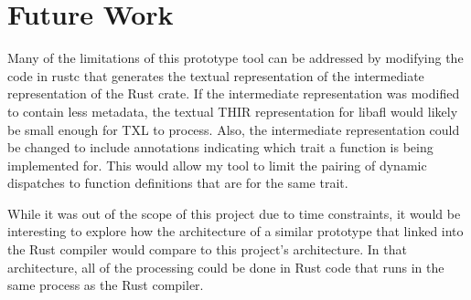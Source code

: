 \documentclass[11pt]{article}
\begin{document}
\section{Future Work}

Many of the limitations of this prototype tool can be addressed by modifying the code in rustc that generates the textual representation of the intermediate representation of the Rust crate.
If the intermediate representation was modified to contain less metadata, the textual THIR representation for libafl would likely be small enough for TXL to process.
Also, the intermediate representation could be changed to include annotations indicating which trait a function is being implemented for.
This would allow my tool to limit the pairing of dynamic dispatches to function definitions that are for the same trait.

While it was out of the scope of this project due to time constraints, it would be interesting to explore how the architecture of a similar prototype that linked into the Rust compiler would compare to this project's architecture.
In that architecture, all of the processing could be done in Rust code that runs in the same process as the Rust compiler.



\end{document}
